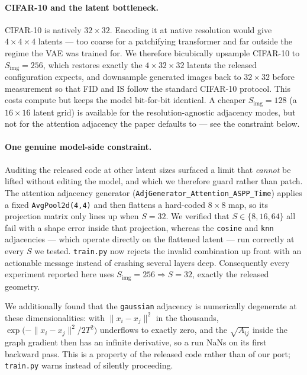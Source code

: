 \documentclass[11pt]{article}
\newcommand{\code}[1]{\texttt{\small #1}}
\begin{document}
\paragraph{CIFAR-10 and the latent bottleneck.}
CIFAR-10 is natively $32\times32$. Encoding it at native resolution would give
$4\times4\times4$ latents --- too coarse for a patchifying transformer and far
outside the regime the VAE was trained for. We therefore bicubically upsample
CIFAR-10 to $S_{\text{img}}=256$, which restores exactly the $4\times32\times32$
latents the released configuration expects, and downsample generated images back
to $32\times32$ before measurement so that FID and IS follow the standard
CIFAR-10 protocol. This costs compute but keeps the model bit-for-bit identical.
A cheaper $S_{\text{img}}=128$ (a $16\times16$ latent grid) is available for the
resolution-agnostic adjacency modes, but not for the attention adjacency the
paper defaults to --- see the constraint below.

\paragraph{One genuine model-side constraint.}
Auditing the released code at other latent sizes surfaced a limit that
\emph{cannot} be lifted without editing the model, and which we therefore guard
rather than patch. The attention adjacency generator
(\code{AdjGenerator\_Attention\_ASPP\_Time}) applies a fixed
\code{AvgPool2d(4,4)} and then flattens a hard-coded $8\times8$ map, so its
projection matrix only lines up when $S = 32$. We verified that
$S \in \{8, 16, 64\}$ all fail with a shape error inside that projection,
whereas the \code{cosine} and \code{knn} adjacencies --- which operate directly
on the flattened latent --- run correctly at every $S$ we tested.
\code{train.py} now rejects the invalid combination up front with an actionable
message instead of crashing several layers deep. Consequently every experiment
reported here uses $S_{\text{img}} = 256 \Rightarrow S = 32$, exactly the
released geometry.

We additionally found that the \code{gaussian} adjacency is numerically
degenerate at these dimensionalities: with $\|x_i - x_j\|^2$ in the thousands,
$\exp\!\big(-\|x_i-x_j\|^2/2T^2\big)$ underflows to exactly zero, and the
$\sqrt{A_{ij}}$ inside the graph gradient then has an infinite derivative, so a
run NaNs on its first backward pass. This is a property of the released code
rather than of our port; \code{train.py} warns instead of silently proceeding.
\end{document}
